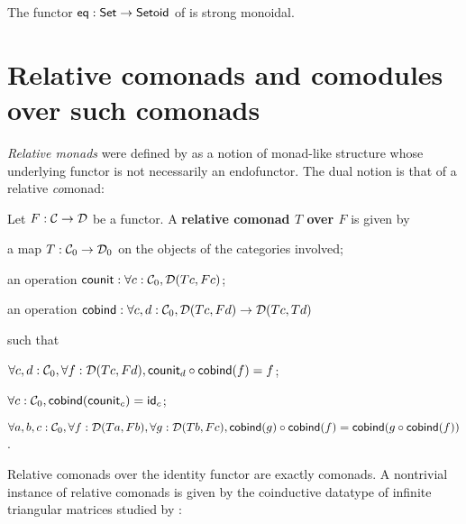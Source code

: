 \documentclass{amsart}
\newcommand{\fat}[1]{\textbf{#1}}
\begin{document}
\begin{example}
  The functor $\eq: \Set \to \Setoid$ of  is strong monoidal.
\end{example}


\section{Relative comonads and comodules over such comonads}\label{sec:comonads}

\emph{Relative monads} were defined by \textcite{DBLP:conf/fossacs/AltenkirchCU10} as a notion of monad-like structure
whose underlying functor is not necessarily an endofunctor.
The dual notion is that of a relative \emph{co}monad:

\begin{definition}\label{def:rel_comonad}
  Let $F:\C\to\D$ be a functor. A \fat{relative comonad $T$ over $F$} is given by
  \begin{packitem}
   \item a map $T:\C_0 \to \D_0$ on the objects of the categories involved;
   \item an operation $\counit : \forall c : \C_0, \D(Tc,Fc)$;
   \item an operation $\cobind: \forall c,d:\C_0, \D(Tc,Fd) \to \D(Tc,Td)$
  \end{packitem}
  such that 
  \begin{packitem}
   \item $\forall c,d:\C_0, \forall f:\D(Tc,Fd), \comp{\cobind(f)}{\counit_d} = f$;
   \item $\forall c : \C_0, \cobind(\counit_c) = \id_c$;
   \item $\forall a,b,c:\C_0, \forall f : \D(Ta,Fb),\forall g:\D(Tb,Fc), \\
        \comp{\cobind(f)}{\cobind(g)} = \cobind(\comp{\cobind(f)}{g})$.
  \end{packitem} 
\end{definition}

Relative comonads over the identity functor are exactly comonads.
A nontrivial instance of relative comonads is given by the coinductive datatype of infinite triangular matrices
studied by \textcite{DBLP:conf/types/MatthesP11}:
\end{document}
